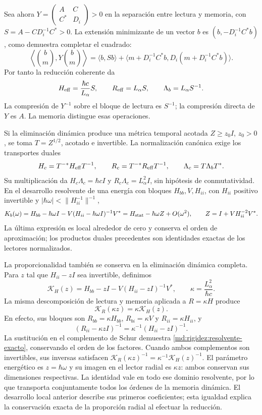 Sea ahora
$Y=\left(\begin{smallmatrix}A&C\\C^*&D_i\end{smallmatrix}\right)>0$
en la separación entre lectura y memoria, con
$S=A-CD_i^{-1}C^*>0$. La extensión minimizante de un vector $b$ es
$(b,-D_i^{-1}C^*b)$, como demuestra completar el cuadrado:
\[
 \left\langle\binom b m,Y\binom b m\right\rangle
 =\langle b,Sb\rangle+
 \langle m+D_i^{-1}C^*b,D_i(m+D_i^{-1}C^*b)\rangle.
\]
Por tanto la reducción coherente da
\[
 H_{\rm eff}=\frac{\hbar c}{L_\alpha}S,\qquad
 R_{\rm eff}=L_\alpha S,\qquad\Lambda_b=L_\alpha S^{-1}.
\]
La compresión de $Y^{-1}$ sobre el bloque de lectura es $S^{-1}$;
la compresión directa de $Y$ es $A$. La memoria distingue esas operaciones.

Si la eliminación dinámica produce una métrica temporal acotada
$Z\ge z_0I$, $z_0>0$, se toma $T=Z^{1/2}$, acotado e invertible.
La normalización canónica exige los transportes duales
\[
 H_c=T^{-*}H_{\rm eff}T^{-1},\qquad
 R_c=T^{-*}R_{\rm eff}T^{-1},\qquad
 \Lambda_c=T\Lambda_bT^*.
\]
Su multiplicación da $H_c\Lambda_c=\hbar cI$ y
$R_c\Lambda_c=L_\alpha^2I$, sin hipótesis de conmutatividad.
En el desarrollo resolvente de una energía con bloques $H_{bb},V,H_{ii}$,
con $H_{ii}$ positivo invertible y
$|\hbar\omega|<\|H_{ii}^{-1}\|^{-1}$,
\[
 K_b(\omega)=H_{bb}-\hbar\omega I
 -V(H_{ii}-\hbar\omega I)^{-1}V^*
 =H_{\rm stat}-\hbar\omega Z+O(\omega^2),
 \qquad Z=I+VH_{ii}^{-2}V^*.
\]
La última expresión es local alrededor de cero y conserva el orden de
aproximación; los productos duales precedentes son identidades exactas
de los lectores normalizados.

La proporcionalidad también se conserva en la eliminación dinámica
completa. Para $z$ tal que $H_{ii}-zI$ sea invertible, definimos
\[
 \mathcal K_H(z)=H_{bb}-zI-V(H_{ii}-zI)^{-1}V^*,\qquad
 \kappa=\frac{L_\alpha^2}{\hbar c}.
\]
La misma descomposición de lectura y memoria aplicada a $R=\kappa H$
produce
\begin{equation}
 \mathcal K_R(\kappa z)=\kappa\mathcal K_H(z).
 \label{md:rigidez:resolvente-exacto}
\end{equation}
En efecto, sus bloques son $R_{bb}=\kappa H_{bb}$,
$R_{bi}=\kappa V$ y $R_{ii}=\kappa H_{ii}$, y
\[
 (R_{ii}-\kappa zI)^{-1}
 =\kappa^{-1}(H_{ii}-zI)^{-1}.
\]
La sustitución en el complemento de Schur demuestra
\eqref{md:rigidez:resolvente-exacto}, conservando el orden de los factores.
Cuando ambos complementos son invertibles, sus inversas satisfacen
$\mathcal K_R(\kappa z)^{-1}=\kappa^{-1}\mathcal K_H(z)^{-1}$.
El parámetro energético es $z=\hbar\omega$ y su imagen en el lector
radial es $\kappa z$: ambos conservan sus dimensiones respectivas.
La identidad vale en todo ese dominio resolvente, por lo que transporta
conjuntamente todos los órdenes de la memoria dinámica. El desarrollo
local anterior describe sus primeros coeficientes; esta igualdad explica
la conservación exacta de la proporción radial al efectuar la reducción.

